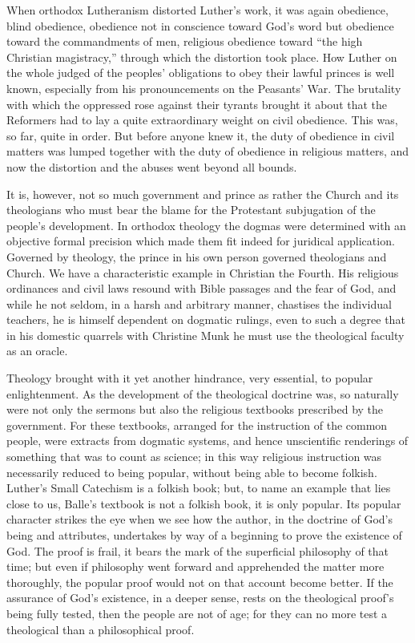 \documentclass[12pt]{book}
\newcommand{\opage}[1]{\marginnote{\footnotesize\textit{[#1]}}}
\begin{document}
When orthodox Lutheranism distorted Luther's work, it was again
obedience, blind obedience, obedience not in conscience toward God's
word but obedience toward the commandments of men, religious obedience
toward ``the high Christian magistracy,'' through which the distortion
took place. How Luther on the whole judged of the peoples' obligations
to obey their lawful princes is well known, especially from his
pronouncements on the Peasants' War. The brutality with which the
oppressed rose against their tyrants brought it about that the
Reformers had to
\opage{127}\setcounter{footnote}{0}%
lay a quite extraordinary weight on civil obedience. This was, so far,
quite in order. But before anyone knew it, the duty of obedience in
civil matters was lumped together with the duty of obedience in
religious matters, and now the distortion and the abuses went beyond
all bounds.

It is, however, not so much government and prince as rather the Church
and its theologians who must bear the blame for the Protestant
subjugation of the people's development. In orthodox theology the
dogmas were determined with an objective formal precision which made
them fit indeed for juridical application. Governed by theology, the
prince in his own person governed theologians and Church. We have a
characteristic example in Christian the Fourth. His religious ordinances
and civil laws resound with Bible passages and the fear of God, and
while he not seldom, in a harsh and arbitrary manner, chastises the
individual teachers, he is himself dependent on dogmatic rulings, even
to such a degree that in his domestic quarrels with Christine Munk he
must use the theological faculty as an oracle.

Theology brought with it yet another hindrance, very essential, to
popular enlightenment. As the development of the theological doctrine
was, so naturally were not only the sermons but also the religious
textbooks prescribed by the government. For these textbooks, arranged
for the instruction of the common people, were extracts from dogmatic
systems, and hence unscientific renderings of something that was to
count as science; in this way religious instruction was necessarily
reduced to being popular, without being able to become
folkish. Luther's Small Catechism is a folkish book; but, to name an
example that lies close to us, Balle's textbook is not a folkish book,
it is only popular.
\opage{128}\setcounter{footnote}{0}%
Its popular character strikes the eye when we see how the author, in
the doctrine of God's being and attributes, undertakes by way of a
beginning to prove the existence of God. The proof is frail, it bears
the mark of the superficial philosophy of that time; but even if
philosophy went forward and apprehended the matter more thoroughly, the
popular proof would not on that account become better. If the assurance
of God's existence, in a deeper sense, rests on the theological proof's
being fully tested, then the people are not of age; for they can no more
test a theological than a philosophical proof.
\end{document}

